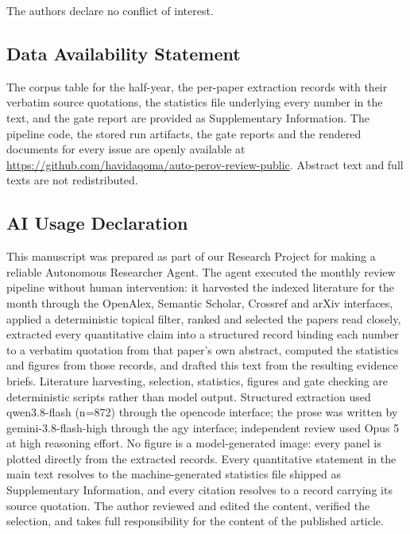 \documentclass[
  11pt,
]{article}
\begin{document}
The authors declare no conflict of interest.

\subsection{Data Availability
Statement}\label{data-availability-statement}

The corpus table for the half-year, the per-paper extraction records
with their verbatim source quotations, the statistics file underlying
every number in the text, and the gate report are provided as
Supplementary Information. The pipeline code, the stored run artifacts,
the gate reports and the rendered documents for every issue are openly
available at
\url{https://github.com/havidaqoma/auto-perov-review-public}. Abstract
text and full texts are not redistributed.

\subsection{AI Usage Declaration}\label{ai-usage-declaration}

This manuscript was prepared as part of our Research Project for making
a reliable Autonomous Researcher Agent. The agent executed the monthly
review pipeline without human intervention: it harvested the indexed
literature for the month through the OpenAlex, Semantic Scholar,
Crossref and arXiv interfaces, applied a deterministic topical filter,
ranked and selected the papers read closely, extracted every
quantitative claim into a structured record binding each number to a
verbatim quotation from that paper's own abstract, computed the
statistics and figures from those records, and drafted this text from
the resulting evidence briefs. Literature harvesting, selection,
statistics, figures and gate checking are deterministic scripts rather
than model output. Structured extraction used qwen3.8-flash (n=872)
through the opencode interface; the prose was written by
gemini-3.8-flash-high through the agy interface; independent review used
Opus 5 at high reasoning effort. No figure is a model-generated image:
every panel is plotted directly from the extracted records. Every
quantitative statement in the main text resolves to the
machine-generated statistics file shipped as Supplementary Information,
and every citation resolves to a record carrying its source quotation.
The author reviewed and edited the content, verified the selection, and
takes full responsibility for the content of the published article.
\end{document}
